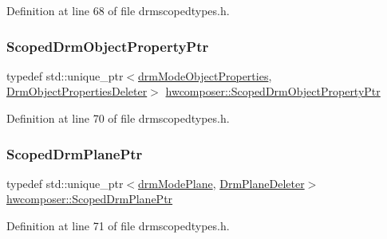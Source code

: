 Definition at line 68 of file drmscopedtypes.\+h.

\mbox{\label{namespacehwcomposer_ace195c2e057b634efb3013a5a4413799}} 
\subsubsection{\texorpdfstring{Scoped\+Drm\+Object\+Property\+Ptr}{ScopedDrmObjectPropertyPtr}}
{\footnotesize\ttfamily typedef std\+::unique\+\_\+ptr$<$\mbox{\hyperlink{drmscopedtypes_8h_a5b9e41a0b21c1a9017be96cfdf9f049c}{drm\+Mode\+Object\+Properties}}, \mbox{\hyperlink{structhwcomposer_1_1DrmObjectPropertiesDeleter}{Drm\+Object\+Properties\+Deleter}}$>$ \mbox{\hyperlink{namespacehwcomposer_ace195c2e057b634efb3013a5a4413799}{hwcomposer\+::\+Scoped\+Drm\+Object\+Property\+Ptr}}}



Definition at line 70 of file drmscopedtypes.\+h.

\mbox{\label{namespacehwcomposer_a65038450f2af31da16cb0817ad1725c8}} 
\subsubsection{\texorpdfstring{Scoped\+Drm\+Plane\+Ptr}{ScopedDrmPlanePtr}}
{\footnotesize\ttfamily typedef std\+::unique\+\_\+ptr$<$\mbox{\hyperlink{drmscopedtypes_8h_a41627c0f0f83a8fc263e592ae28ae6b4}{drm\+Mode\+Plane}}, \mbox{\hyperlink{structhwcomposer_1_1DrmPlaneDeleter}{Drm\+Plane\+Deleter}}$>$ \mbox{\hyperlink{namespacehwcomposer_a65038450f2af31da16cb0817ad1725c8}{hwcomposer\+::\+Scoped\+Drm\+Plane\+Ptr}}}



Definition at line 71 of file drmscopedtypes.\+h.

\mbox{\label{namespacehwcomposer_a0f1486ef5a49e79373fe75dfd767b85f}} 
